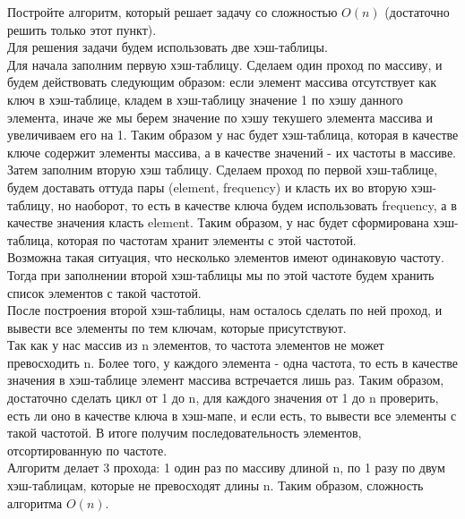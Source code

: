 \documentclass[12pt]{extreport}
\theoremstyle{definiton}
\theoremstyle{definition}
\theoremstyle{definition}
\newcounter{problem}
\newcounter{subproblem}
\def\PRSUBskip{
	\medskip
}
\def\prsub{\PRSUBskip\noindent\stepcounter{subproblem}{\sf \thesubproblem.}\;}
\def\prend{
	\medskip
}
\begin{document}
	 \prsub Постройте алгоритм, который решает задачу со сложностью $O(n)$ (достаточно решить только этот пункт).
	 \newline
	 \\ Для решения задачи будем использовать две хэш-таблицы.
	 \\ Для начала заполним первую хэш-таблицу. Сделаем один проход по массиву, и будем действовать следующим образом: если элемент массива отсутствует как ключ в хэш-таблице, кладем в хэш-таблицу значение 1 по хэшу данного элемента, иначе же мы берем значение по хэшу текушего элемента массива и увеличиваем его на 1. Таким образом у нас будет хэш-таблица, которая в качестве ключе содержит элементы массива, а в качестве значений - их частоты в массиве.
	 \\ Затем заполним вторую хэш таблицу. Сделаем проход по первой хэш-таблице, будем доставать оттуда пары (element, frequency) и класть их во вторую хэш-таблицу, но наоборот, то есть в качестве ключа будем использовать frequency, а в качестве значения класть element. Таким образом, у нас будет сформирована хэш-таблица, которая по частотам хранит элементы с этой частотой. 
	 \\ Возможна такая ситуация, что несколько элементов имеют одинаковую частоту. Тогда при заполнении второй хэш-таблицы мы по этой частоте будем хранить список элементов с такой частотой.
	 \\После построения второй хэш-таблицы, нам осталось сделать по ней проход, и вывести все элементы по тем ключам, которые присутствуют.
	 \\ Так как у нас массив из n элементов, то частота элементов не может превосходить n. Более того, у каждого элемента - одна частота, то есть в качестве значения в хэш-таблице элемент массива встречается лишь раз. Таким образом, достаточно сделать цикл от 1 до n, для каждого значения от 1 до n проверить, есть ли оно в качестве ключа в хэш-мапе, и если есть, то вывести все элементы с такой частотой. В итоге получим последовательность элементов, отсортированную по частоте.
	 \\ Алгоритм делает 3 прохода: 1 один раз по массиву длиной n, по 1 разу по двум хэш-таблицам, которые не превосходят длины n. Таким образом, сложность алгоритма $O(n)$.

	 \prend
\end{document}
